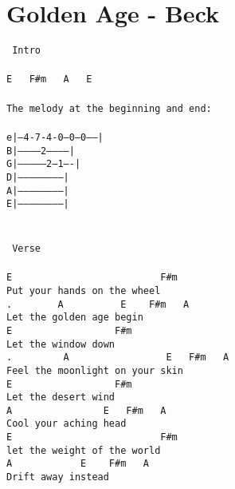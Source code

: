 \newpage
\section{Golden Age - Beck}
\label{Golden Age - Beck}
\texttt{\lbrack\ Intro\rbrack\\
\\
E\ \ \ F\#m\ \ \ A\ \ \ E\\
\\
The\ melody\ at\ the\ beginning\ and\ end:\\
\\
e|---4-7-4-0---0---0------|\\
B|-----------2------------|\\
G|---------------2---1----|\\
D|------------------------|\\
A|------------------------|\\
E|------------------------|\\
\\
\\
\lbrack\ Verse\rbrack\\
\\
E\ \ \ \ \ \ \ \ \ \ \ \ \ \ \ \ \ \ \ \ \ \ \ \ \ \ F\#m\\
Put\ your\ hands\ on\ the\ wheel\\
. \ \ \ \ \ \ \ A\ \ \ \ \ \ \ \ \ \ E\ \ \ \ F\#m\ \ \ A\\
Let\ the\ golden\ age\ begin\\
E\ \ \ \ \ \ \ \ \ \ \ \ \ \ \ \ \ \ F\#m\\
Let\ the\ window\ down\\
. \ \ \ \ \ \ \ \ A\ \ \ \ \ \ \ \ \ \ \ \ \ \ \ \ \ E\ \ \ F\#m\ \ \ A\\
Feel\ the\ moonlight\ on\ your\ skin\\
E\ \ \ \ \ \ \ \ \ \ \ \ \ \ \ \ \ \ F\#m\\
Let\ the\ desert\ wind\\
A\ \ \ \ \ \ \ \ \ \ \ \ \ \ \ \ E\ \ \ F\#m\ \ \ A\\
Cool\ your\ aching\ head\\
E\ \ \ \ \ \ \ \ \ \ \ \ \ \ \ \ \ \ \ \ \ \ \ \ \ \ F\#m\\
let\ the\ weight\ of\ the\ world\\
A\ \ \ \ \ \ \ \ \ \ \ \ E\ \ \ \ F\#m\ \ \ A\\
Drift\ away\ instead\\
\\
\\
}
